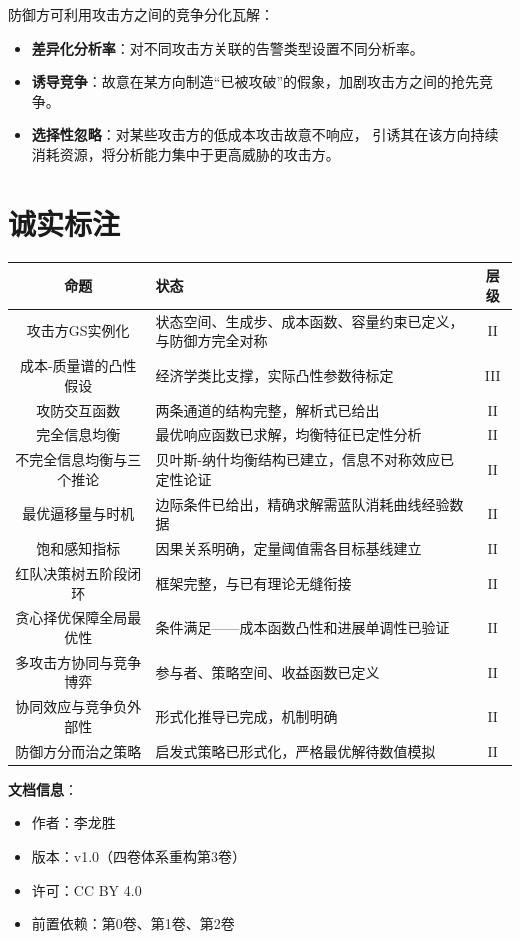 \documentclass[11pt,a4paper]{article}
\begin{document}
防御方可利用攻击方之间的竞争分化瓦解：
\begin{itemize}
    \item \textbf{差异化分析率}：对不同攻击方关联的告警类型设置不同分析率。
    \item \textbf{诱导竞争}：故意在某方向制造“已被攻破”的假象，加剧攻击方之间的抢先竞争。
    \item \textbf{选择性忽略}：对某些攻击方的低成本攻击故意不响应，
          引诱其在该方向持续消耗资源，将分析能力集中于更高威胁的攻击方。
\end{itemize}

\section{诚实标注}

\begin{center}
\begin{xltabular}{\textwidth}{c|X|c}
\toprule
\textbf{命题} & \textbf{状态} & \textbf{层级} \\
\midrule
攻击方GS实例化 & 状态空间、生成步、成本函数、容量约束已定义，与防御方完全对称 & II \\
成本-质量谱的凸性假设 & 经济学类比支撑，实际凸性参数待标定 & III \\
攻防交互函数 & 两条通道的结构完整，解析式已给出 & II \\
完全信息均衡 & 最优响应函数已求解，均衡特征已定性分析 & II \\
不完全信息均衡与三个推论 & 贝叶斯-纳什均衡结构已建立，信息不对称效应已定性论证 & II \\
最优逼移量与时机 & 边际条件已给出，精确求解需蓝队消耗曲线经验数据 & II \\
饱和感知指标 & 因果关系明确，定量阈值需各目标基线建立 & II \\
红队决策树五阶段闭环 & 框架完整，与已有理论无缝衔接 & II \\
贪心择优保障全局最优性 & 条件满足——成本函数凸性和进展单调性已验证 & II \\
多攻击方协同与竞争博弈 & 参与者、策略空间、收益函数已定义 & II \\
协同效应与竞争负外部性 & 形式化推导已完成，机制明确 & II \\
防御方分而治之策略 & 启发式策略已形式化，严格最优解待数值模拟 & II \\
\bottomrule
\end{xltabular}
\end{center}

\vspace{5mm}
\noindent\textbf{文档信息}：
\begin{itemize}
    \item 作者：李龙胜
    \item 版本：v1.0（四卷体系重构第3卷）
    \item 许可：CC BY 4.0
    \item 前置依赖：第0卷、第1卷、第2卷
\end{itemize}
\end{document}
